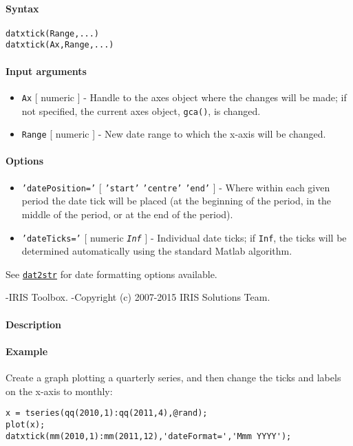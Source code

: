 


	\paragraph{Syntax}

\begin{verbatim}
datxtick(Range,...)
datxtick(Ax,Range,...)
\end{verbatim}

\paragraph{Input arguments}

\begin{itemize}
\item
  \texttt{Ax} {[} numeric {]} - Handle to the axes object where the
  changes will be made; if not specified, the current axes object,
  \texttt{gca()}, is changed.
\item
  \texttt{Range} {[} numeric {]} - New date range to which the x-axis
  will be changed.
\end{itemize}

\paragraph{Options}

\begin{itemize}
\item
  \texttt{'datePosition='} {[} \texttt{'start'} \textbar{}
  \texttt{'centre'} \textbar{} \texttt{'end'} {]} - Where within each
  given period the date tick will be placed (at the beginning of the
  period, in the middle of the period, or at the end of the period).
\item
  \texttt{'dateTicks='} {[} numeric \textbar{} \emph{\texttt{Inf}} {]} -
  Individual date ticks; if \texttt{Inf}, the ticks will be determined
  automatically using the standard Matlab algorithm.
\end{itemize}

See \href{dates/dat2str}{\texttt{dat2str}} for date formatting options
available.

-IRIS Toolbox. -Copyright (c) 2007-2015 IRIS Solutions Team.

\paragraph{Description}

\paragraph{Example}

Create a graph plotting a quarterly series, and then change the ticks
and labels on the x-axis to monthly:

\begin{verbatim}
x = tseries(qq(2010,1):qq(2011,4),@rand);
plot(x);
datxtick(mm(2010,1):mm(2011,12),'dateFormat=','Mmm YYYY');
\end{verbatim}


